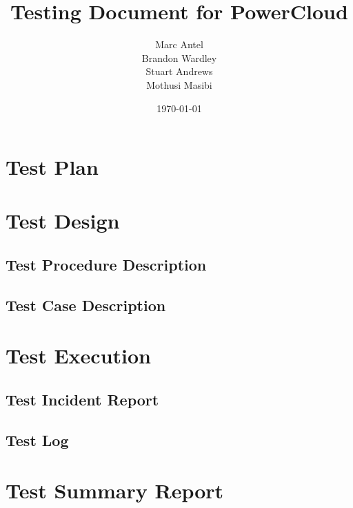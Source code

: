 \documentclass[a4paper,10pt]{article}
\title{Testing Document for PowerCloud}
\author{Marc Antel\\ Brandon Wardley\\ Stuart Andrews\\ Mothusi Masibi}
\date{\today}
\begin{document}
	\maketitle
	\newpage
	\section{Test Plan}
	\section{Test Design}
	\subsection{Test Procedure Description}
	\subsection{Test Case Description}
	\section{Test Execution}
	\subsection{Test Incident Report}
	\subsection{Test Log}
	\section{Test Summary Report}
\end{document}
